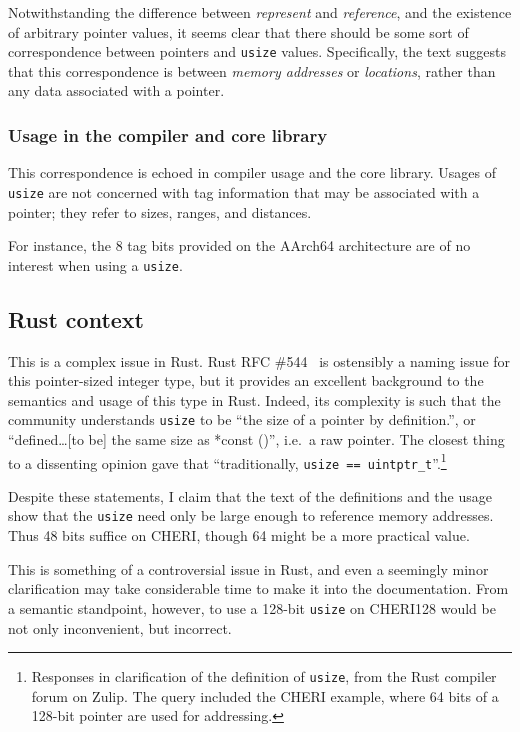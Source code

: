 \documentclass[dissertation.tex]{subfiles}
\begin{document}
Notwithstanding the difference between \emph{represent} and
\emph{reference}, and the existence of arbitrary pointer values, it
seems clear that there should be some sort of correspondence between
pointers and \texttt{usize} values.
Specifically, the text suggests that this correspondence is between
\emph{memory addresses} or \emph{locations}, rather than any data
associated with a pointer.

\subsubsection{Usage in the compiler and core library}
This correspondence is echoed in compiler usage and the core library.
Usages of \texttt{usize} are not concerned with tag information that may
be associated with a pointer; they refer to sizes, ranges, and
distances.

For instance, the 8 tag bits provided on the AArch64 architecture are of
no interest when using a \texttt{usize}.


\subsection{Rust context}
This is a complex issue in Rust.
Rust RFC \#544~\cite{rust-rfc-isize} is ostensibly a naming issue for
this pointer-sized integer type, but it provides an excellent background
to the semantics and usage of this type in Rust.
Indeed, its complexity is such that the community understands
\texttt{usize} to be ``the size of a pointer by definition.'', or
``defined\ldots[to be] the same size as *const ()'', i.e.\ a raw
pointer.
The closest thing to a dissenting opinion gave that ``traditionally,
\texttt{usize == uintptr\_t}''.\footnote{
Responses in clarification of the definition of \texttt{usize}, from the
Rust compiler forum on Zulip.
The query included the CHERI example, where 64 bits of a 128-bit pointer
are used for addressing.
}

Despite these statements, I claim that the text of the definitions and
the usage show that the \texttt{usize} need only be large enough to
reference memory addresses.
Thus 48 bits suffice on CHERI, though 64 might be a more practical
value.

This is something of a controversial issue in Rust, and even a seemingly
minor clarification may take considerable time to make it into the
documentation.
From a semantic standpoint, however, to use a 128-bit \texttt{usize} on
CHERI128 would be not only inconvenient, but incorrect.
\end{document}

